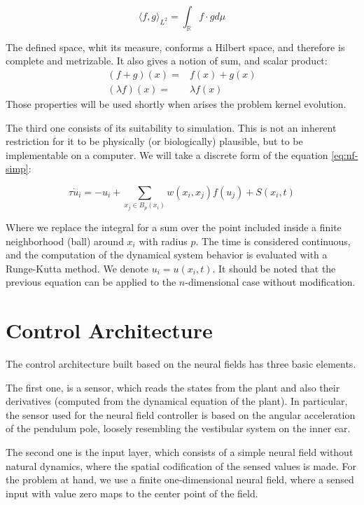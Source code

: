 \begin{equation}
  \label{eq:eq-l2}
  \langle f,g \rangle_{L^2} = \int_{\mathbb{R}}{f\cdot g d\mu}
\end{equation}

The defined space, whit its measure, conforms a Hilbert space, and
therefore is complete and metrizable. It also gives a notion of sum,
and scalar product:
\begin{eqnarray}
  \label{eq:eq-leb-opers}
  (f+g)(x)=&f(x)+g(x) \\
  (\lambda f)(x)=&\lambda f(x)
\end{eqnarray}
Those properties will be used shortly when arises the problem
kernel evolution.

The third one consists of its suitability to simulation. This is not an
inherent restriction for it to be physically (or biologically)
plausible, but to be implementable on a computer. We will take a
discrete form of the equation \ref{eq:nf-simp}:


\begin{equation}
  \label{eq:nf-disc}
  \tau \dot{u}_i=-u_i+\sum_{x_j \in B_p(x_i)} {w\left(x_i,x_j\right)
    f\left( u_j \right)}+S(x_i,t)
\end{equation}

Where we replace the integral for a sum over the point included inside
a finite neighborhood (ball) around $x_i$ with radius $p$. The time is considered
continuous, and the computation of the dynamical system behavior is
evaluated with a Runge-Kutta method. We denote $u_i=u(x_i,t)$. It
should be noted that the previous equation can be applied to the
$n$-dimensional case without modification.

\section{Control Architecture}
The control architecture built based on the neural fields has three
basic elements. 

The first one, is a sensor, which reads the states
from the plant and also their derivatives (computed from the dynamical
equation of the plant). In particular, the sensor used for the neural
field controller is based on the angular acceleration of the pendulum
pole, loosely resembling the vestibular system on the inner ear.

The second one is the input layer, which consists of a simple neural
field without natural dynamics, where the spatial codification of the
sensed values is made. For the problem at hand, we use a
finite one-dimensional neural field, where a sensed input with value
zero maps to the center point of the field.


